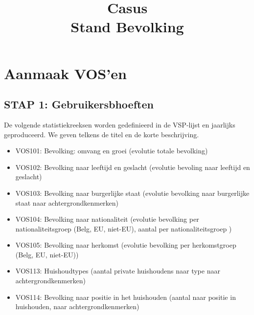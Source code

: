 \documentclass{SVnote}
\begin{document}
\title[Casus Stand Bevolking]{Casus\\Stand Bevolking}

\titlepage



\section{Aanmaak VOS'en}

\subsection{STAP 1: Gebruikersbhoeften}

De volgende statistiekreeksen worden gedefinieerd in de VSP-lijst en jaarlijks geproduceerd. We geven telkens de titel en de korte beschrijving.
\begin{itemize}
\item VOS101: Bevolking: omvang en groei (evolutie totale bevolking)
\item VOS102: Bevolking naar leeftijd en geslacht (evolutie bevoling naar leeftijd en geslacht)
\item VOS103: Bevolking naar burgerlijke staat (evolutie bevolking naar burgerlijke staat naar achtergrondkenmerken)
\item VOS104: Bevolking naar nationaliteit (evolutie bevolking per nationaliteitsgroep (Belg, EU, niet-EU), aantal per nationaliteitsgroep )
\item VOS105: Bevolking naar herkomst (evolutie bevolking per herkomstgroep (Belg, EU, niet-EU))
\item VOS113: Huishoudtypes	(aantal private huishoudens naar type naar achtergrondkenmerken)
\item VOS114:  Bevolking naar positie in het huishouden (aantal naar positie in huishouden, naar achtergrondkenmerken)
\end{itemize}
\end{document}

